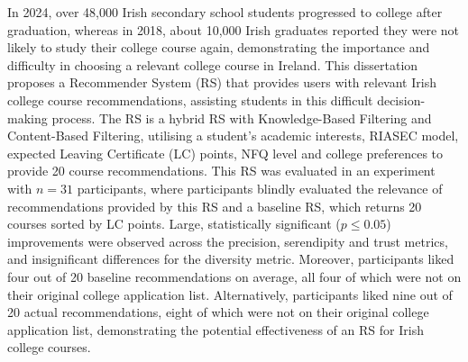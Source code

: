 \documentclass[a4paper, 12pt, oneside]{report}         %
\begin{document}

\thesistitlepage                                  %

\thesisdeclarationpage

\begin{thesisabstract}                            %
In 2024, over 48,000 Irish secondary school students progressed to college after graduation,
whereas in 2018, about 10,000 Irish graduates reported they were not likely to study their college course again,
demonstrating the importance and difficulty in choosing a relevant college course in Ireland.
This dissertation proposes a
Recommender System (RS) that provides users with relevant Irish college course recommendations,
assisting students in this difficult decision-making process.
The RS is a hybrid RS with Knowledge-Based Filtering and Content-Based Filtering, utilising 
a student's academic interests, RIASEC model, expected Leaving Certificate (LC) points, NFQ level and college preferences to provide 20 course recommendations.
This RS was evaluated in an experiment with $n=31$ participants,
where participants blindly evaluated the relevance of recommendations provided by this RS and a baseline RS,
which returns 20 courses sorted by LC points.
Large, statistically significant ($p \leq 0.05$) improvements were observed across the precision, serendipity and trust metrics,
and insignificant differences for the diversity metric.
Moreover, participants liked four out of 20 baseline recommendations on average, all four of which were not on their original college application list.
Alternatively, participants liked nine out of 20 actual recommendations, eight of which were not on their original college application list,
demonstrating the potential effectiveness of an RS for Irish college courses.
\end{thesisabstract}



\thesisdedicationpage                            %
\end{document}
